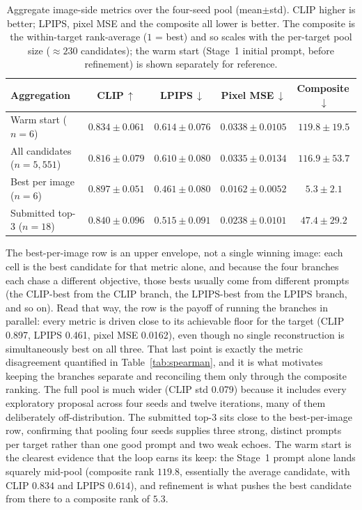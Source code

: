 \documentclass[runningheads]{llncs}
\begin{document}
\begin{table}[H]
\centering
\caption{Aggregate image-side metrics over the four-seed pool (mean$\pm$std). CLIP higher is better; LPIPS, pixel MSE and the composite all lower is better. The composite is the within-target rank-average ($1$ = best) and so scales with the per-target pool size ($\approx 230$ candidates); the warm start (Stage~1 initial prompt, before refinement) is shown separately for reference.}
\label{tab:aggregate}
\small
\begin{tabular}{l c c c c}
\toprule
\textbf{Aggregation} & \textbf{CLIP\,$\uparrow$} & \textbf{LPIPS\,$\downarrow$} & \textbf{Pixel MSE\,$\downarrow$} & \textbf{Composite\,$\downarrow$} \\
\midrule
Warm start ($n{=}6$) & $0.834\pm0.061$ & $0.614\pm0.076$ & $0.0338\pm0.0105$ & $119.8\pm19.5$ \\
\midrule
All candidates ($n{=}5{,}551$) & $0.816\pm0.079$ & $0.610\pm0.080$ & $0.0335\pm0.0134$ & $116.9\pm53.7$ \\
Best per image ($n{=}6$) & $\mathbf{0.897\pm0.051}$ & $\mathbf{0.461\pm0.080}$ & $\mathbf{0.0162\pm0.0052}$ & $\mathbf{5.3\pm2.1}$ \\
Submitted top-3 ($n{=}18$) & $0.840\pm0.096$ & $0.515\pm0.091$ & $0.0238\pm0.0101$ & $47.4\pm29.2$ \\
\bottomrule
\end{tabular}
\end{table}

\noindent
The best-per-image row is an upper envelope, not a single winning image: each cell is the best candidate for that metric alone, and because the four branches each chase a different objective, those bests usually come from different prompts (the CLIP-best from the CLIP branch, the LPIPS-best from the LPIPS branch, and so on). Read that way, the row is the payoff of running the branches in parallel: every metric is driven close to its achievable floor for the target (CLIP 0.897, LPIPS 0.461, pixel MSE 0.0162), even though no single reconstruction is simultaneously best on all three. That last point is exactly the metric disagreement quantified in Table~\ref{tab:spearman}, and it is what motivates keeping the branches separate and reconciling them only through the composite ranking. The full pool is much wider (CLIP std 0.079) because it includes every exploratory proposal across four seeds and twelve iterations, many of them deliberately off-distribution. The submitted top-3 sits close to the best-per-image row, confirming that pooling four seeds supplies three strong, distinct prompts per target rather than one good prompt and two weak echoes. The warm start is the clearest evidence that the loop earns its keep: the Stage~1 prompt alone lands squarely mid-pool (composite rank $119.8$, essentially the average candidate, with CLIP $0.834$ and LPIPS $0.614$), and refinement is what pushes the best candidate from there to a composite rank of $5.3$.
\end{document}
